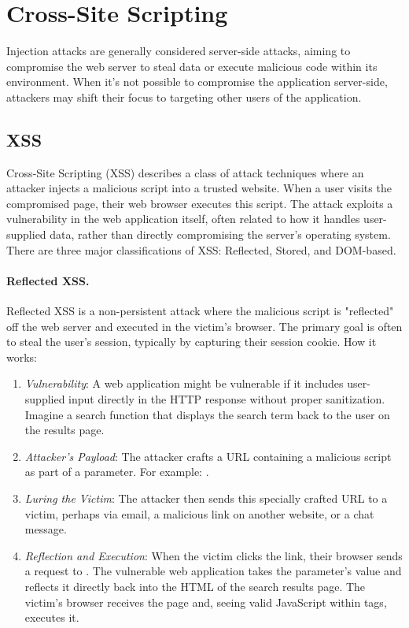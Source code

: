 \section{Cross-Site Scripting}
Injection attacks are generally considered server-side attacks, aiming to compromise the web server to steal data or execute malicious code within its environment. When it's not possible to compromise the application server-side, attackers may shift their focus to targeting other users of the application.

\subsection{XSS}
Cross-Site Scripting (XSS) describes a class of attack techniques where an attacker injects a malicious script into a trusted website. When a user visits the compromised page, their web browser executes this script. The attack exploits a vulnerability in the web application itself, often related to how it handles user-supplied data, rather than directly compromising the server's operating system. There are three major classifications of XSS: Reflected, Stored, and DOM-based.

\paragraph{Reflected XSS.} Reflected XSS is a non-persistent attack where the malicious script is "reflected" off the web server and executed in the victim's browser. The primary goal is often to steal the user's session, typically by capturing their session cookie. How it works:

\begin{enumerate}
    \item \textit{Vulnerability}: A web application might be vulnerable if it includes user-supplied input directly in the HTTP response without proper sanitization. Imagine a search function that displays the search term back to the user on the results page.
    \item \textit{Attacker's Payload}: The attacker crafts a URL containing a malicious script as part of a parameter. For example: .
    \item \textit{Luring the Victim}: The attacker then sends this specially crafted URL to a victim, perhaps via email, a malicious link on another website, or a chat message.
    \item \textit{Reflection and Execution}: When the victim clicks the link, their browser sends a request to . The vulnerable web application takes the  parameter's value and reflects it directly back into the HTML of the search results page. The victim's browser receives the page and, seeing valid JavaScript within  tags, executes it.
\end{enumerate}

